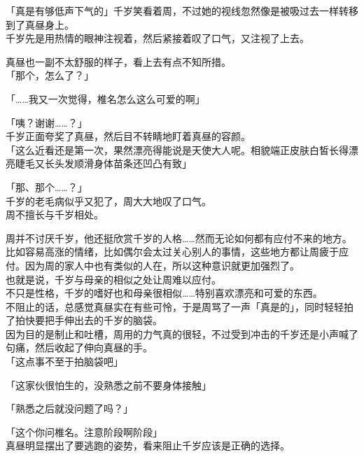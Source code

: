 「真是有够低声下气的」千岁笑看着周，不过她的视线忽然像是被吸过去一样转移到了真昼身上。\\

千岁先是用热情的眼神注视着，然后紧接着叹了口气，又注视了上去。

真昼也一副不太舒服的样子，看上去有点不知所措。\\

「那个，怎么了？」

「……我又一次觉得，椎名怎么这么可爱的啊」

「咦？谢谢……？」\\

千岁正面夸奖了真昼，然后目不转睛地盯着真昼的容颜。\\

「这么近看还是第一次，果然漂亮得能说是天使大人呢。相貌端正皮肤白皙长得漂亮睫毛又长头发顺滑身体苗条还凹凸有致」

「那、那个……？」\\

千岁的老毛病似乎又犯了，周大大地叹了口气。\\

周不擅长与千岁相处。

周并不讨厌千岁，他还挺欣赏千岁的人格……然而无论如何都有应付不来的地方。比如容易高涨的情绪，比如偶尔会太过关心别人的事情，这些地方都让周疲于应付。因为周的家人中也有类似的人在，所以这种意识就更加强烈了。\\

也就是说，千岁与母亲的相似之处让周难以应付。\\

不只是性格，千岁的嗜好也和母亲很相似……特别喜欢漂亮和可爱的东西。\\

不阻止的话，总感觉真昼实在有些可怜，于是周骂了一声「真是的」，同时轻轻拍了拍快要把手伸出去的千岁的脑袋。\\

因为目的是制止和吐槽，周用的力气真的很轻，不过受到冲击的千岁还是小声喊了句痛，然后收起了伸向真昼的手。\\

「这点事不至于拍脑袋吧」

「这家伙很怕生的，没熟悉之前不要身体接触」

「熟悉之后就没问题了吗？」

「这个你问椎名。注意阶段啊阶段」\\

真昼明显摆出了要逃跑的姿势，看来阻止千岁应该是正确的选择。\\

